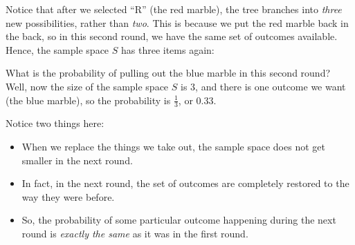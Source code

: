 \documentclass[../../../main.tex]{subfiles}
\begin{document}
\noindent
Notice that after we selected ``R'' (the red marble), the tree branches into \emph{three} new possibilities, rather than \emph{two}. This is because we put the red marble back in the back, so in this second round, we have the same set of outcomes available. Hence, the sample space $S$ has three items again:

\begin{center}
\end{center}

\noindent
What is the probability of pulling out the blue marble in this second round? Well, now the size of the sample space $S$ is 3, and there is one outcome we want (the blue marble), so the probability is $\frac{1}{3}$, or 0.33. 

Notice two things here:

\begin{itemize}

  \item When we replace the things we take out, the sample space does not get smaller in the next round.
  
  \item In fact, in the next round, the set of outcomes are completely restored to the way they were before.
  
  \item So, the probability of some particular outcome happening during the next round is \emph{exactly the same} as it was in the first round.

\end{itemize}
\end{document}
